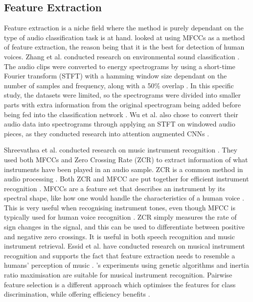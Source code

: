 \documentclass[class=report,11pt,crop=false]{standalone}
\begin{document}
\subsection{Feature Extraction} \label{ss: FE}

Feature extraction is a niche field where the method is purely dependant on the type of audio classification task is at hand. \cite{Vimal_2021} looked at using MFCCs as a method of feature extraction, the reason being that it is the best for detection of human voices. Zhang et al.  conducted research on environmental sound classification \cite{Zhang2021}. The audio clips were converted to energy spectrograms by using a short-time Fourier transform (STFT) with a hamming window size dependant on the number of samples and frequency, along with a 50\% overlap \cite{Zhang2021}. In this specific study, the datasets were limited, so the spectrograms were divided into smaller parts with extra information from the original spectrogram being added before being fed into the classification network \cite{Zhang2021}. Wu et al. also chose to convert their audio data into spectrograms through applying an STFT on windowed audio pieces, as they conducted research into attention augmented CNNs \cite{Wu_2018}. 

Shreevathsa et al. conducted research on music instrument recognition \cite{Shreevathsa_2020}. They used both MFCCs and Zero Crossing Rate (ZCR) to extract information of what instruments have been played in an audio sample. ZCR is a common method in audio processing \cite{Shreevathsa_2020}. Both ZCR and MFCC are put together for efficient instrument recognition \cite{Shreevathsa_2020}. MFCCs are a feature set that describes an instrument by its spectral shape, like how one would handle the characteristics of a human voice \cite{Shreevathsa_2020}. This is very useful when recognising instrument tones, even though MFCC is typically used for human voice recognition \cite{Shreevathsa_2020}. ZCR simply measures the rate of sign changes in the signal, and this can be used to differentiate between positive and negative zero crossings. It is useful in both speech recognition and music instrument retrieval. Essid et al. have conducted research on musical instrument recognition and supports the fact that feature extraction needs to resemble a humans’ perception of music \cite{Essid_2006}. \cite{Essid_2006}'s experiments using genetic algorithms and inertia ratio maximisation are suitable for musical instrument recognition. Pairwise feature selection is a different approach which optimises the features for class discrimination, while offering efficiency benefits \cite{Essid_2006}. 
\end{document}
